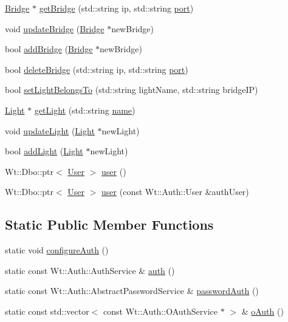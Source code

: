 \begin{DoxyCompactItemize}
\hyperlink{class_bridge}{Bridge} $\ast$ \hyperlink{class_session_a5731961d665ab9e0a01f5c95b1114f88}{get\+Bridge} (std\+::string ip, std\+::string \hyperlink{_bridge_control_8_c_ae969f7204a7e846b98a88497dd85f672}{port})
\item 
void \hyperlink{class_session_aa40d013373490cddefcfb4904dfc3e81}{update\+Bridge} (\hyperlink{class_bridge}{Bridge} $\ast$new\+Bridge)
\item 
bool \hyperlink{class_session_af578feecff75f6eabc70d4110d04b04c}{add\+Bridge} (\hyperlink{class_bridge}{Bridge} $\ast$new\+Bridge)
\item 
bool \hyperlink{class_session_ab227752536d56a50a7b54373098dccd3}{delete\+Bridge} (std\+::string ip, std\+::string \hyperlink{_bridge_control_8_c_ae969f7204a7e846b98a88497dd85f672}{port})
\item 
bool \hyperlink{class_session_a4670d4ae1102848d8e64d634f54946d3}{set\+Light\+Belongs\+To} (std\+::string light\+Name, std\+::string bridge\+IP)
\item 
\hyperlink{class_light}{Light} $\ast$ \hyperlink{class_session_acce07120fe6fe2cb3a63f1ba119d27d9}{get\+Light} (std\+::string \hyperlink{_bridge_control_8_c_a8ccf841cb59e451791bcb2e1ac4f1edc}{name})
\item 
void \hyperlink{class_session_af570bdb239adcc1e8b0c4951681cdcf4}{update\+Light} (\hyperlink{class_light}{Light} $\ast$new\+Light)
\item 
bool \hyperlink{class_session_a7cbed13dc3a89c26910c09fb32efc279}{add\+Light} (\hyperlink{class_light}{Light} $\ast$new\+Light)
\item 
Wt\+::\+Dbo\+::ptr$<$ \hyperlink{class_user}{User} $>$ \hyperlink{class_session_a8869e1a43a0131699f9dc234c96b45c9}{user} ()
\item 
Wt\+::\+Dbo\+::ptr$<$ \hyperlink{class_user}{User} $>$ \hyperlink{class_session_af4b107688e55ec0614d8181688c7dee7}{user} (const Wt\+::\+Auth\+::\+User \&auth\+User)
\end{DoxyCompactItemize}
\subsection*{Static Public Member Functions}
\begin{DoxyCompactItemize}
\item 
static void \hyperlink{class_session_a02ee7e0bfcaf6470f35661ec30b8cf8b}{configure\+Auth} ()
\item 
static const Wt\+::\+Auth\+::\+Auth\+Service \& \hyperlink{class_session_a7fe071d1b3aee64cdf9f3601cdeb42fb}{auth} ()
\item 
static const Wt\+::\+Auth\+::\+Abstract\+Password\+Service \& \hyperlink{class_session_a06fdfd453428ecbe0e1cce81470bca69}{password\+Auth} ()
\item 
static const std\+::vector$<$ const Wt\+::\+Auth\+::\+O\+Auth\+Service $\ast$ $>$ \& \hyperlink{class_session_a22252a55fec95eec790ca74ce9559a54}{o\+Auth} ()
\end{DoxyCompactItemize}

